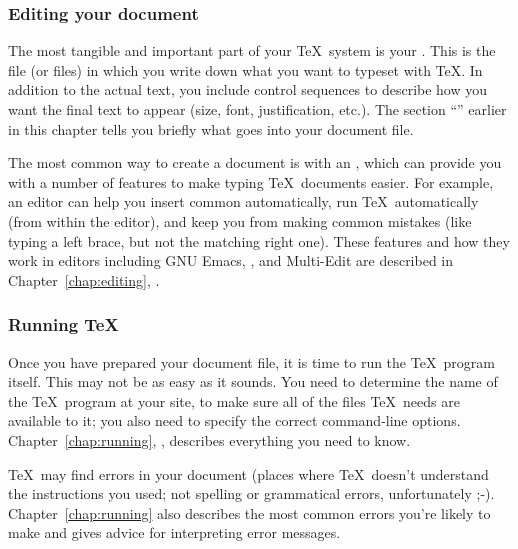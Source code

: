 
\subsubsection{Editing your document}

The most tangible and important part of your \TeX\ system is 
your .
This is the file (or files) in which you write down what you want to typeset with
\TeX.  In addition to the actual text, you include 
control sequences to describe how you want the final text
to appear (size, font, justification, etc.).  The section
``'' earlier in this chapter tells you briefly
what goes into your document file.

The most common way to create a document is with 
an , which can provide you with a number of features to
make typing \TeX\
documents easier.  For example, an editor can help you insert
common  automatically, run \TeX\ automatically 
(from within
the editor), and keep you from making common mistakes (like typing a left
brace, but not the matching right one).  These features and how they
work in editors including GNU Emacs, \auctex, and Multi-Edit are
described in Chapter~\ref{chap:editing}, {\it{}}.

\subsubsection{Running \protect\TeX}
\label{subsubsec:runningtex}

Once you have prepared your document file, it is time 
to run the \TeX\
program itself.  This may not be as easy as it sounds.  You need to determine
the name of the \TeX\ program at your site, to make sure
all of the files \TeX\ needs are available to it; you also need to specify the correct
command-line options.  Chapter~\ref{chap:running}, {\it{}},
describes everything you need to know.

\TeX\ may find errors in your document (places where \TeX\ doesn't
understand the instructions you used; not spelling or grammatical
errors, unfortunately ;-). Chapter~\ref{chap:running} also describes
the most common errors you're likely to make and gives advice for
interpreting error messages.

